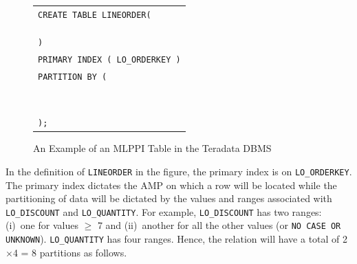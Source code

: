 \documentclass[runningheads]{comsis2}
\begin{document}
\begin{figure}[t]
\begin{center}
{\small
\begin{tabular}{l}
{\tt CREATE TABLE LINEORDER(} \\
\hspace{0.1in}{\tt LO\_ORDERKEY INTEGER,} \\
\hspace{0.1in}{\tt LO\_QUANTITY INTEGER,} \\
\hspace{0.1in}{\tt LO\_DISCOUNT INTEGER} \\
{\tt )} \\
{\tt PRIMARY INDEX ( LO\_ORDERKEY )} \\
{\tt PARTITION BY (} \\
\hspace{0.1in}{\tt CASE\_N(} \\
\hspace{0.2in}{\tt LO\_DISCOUNT >= 7,} \\
\hspace{0.2in}{\tt NO CASE OR UNKNOWN),} \\
\hspace{0.1in}{\tt CASE\_N(}\\
\hspace{0.2in}{\tt LO\_QUANTITY < 25,} \\
\hspace{0.2in}{\tt LO\_QUANTITY >= 25 AND LO\_QUANTITY <= 30,} \\
\hspace{0.2in}{\tt LO\_QUANTITY > 30 AND LO\_QUANTITY <= 35,} \\
\hspace{0.2in}{\tt NO CASE OR UNKNOWN)} \\
{\tt );} \\
\end{tabular}
}
\end{center}
\vspace{-0.2in}
\caption{An Example of an MLPPI Table in the Teradata DBMS\label{fig:exam}}
\end{figure}

In the definition of {\tt LINEORDER} in the figure, the primary index 
is on {\tt LO\_ORDERKEY}. 
The \hbox{primary} index \hbox{dictates} the AMP on which a row will be located 
while the partitioning of data will be dictated by the values and 
ranges associated with {\tt LO\_DISCOUNT} and {\tt LO\_QUANTITY}. 
For example, {\tt LO\_DISCOUNT} has two ranges: (i)~one for \hbox{values} $\geq$ 7 
and (ii)~another for all the other values (or {\tt NO CASE OR UNKNOWN}). 
{\tt LO\_QUANTITY} has four ranges. 
Hence, the relation will have a total of 2$\times$4 = 8 partitions as follows.
\end{document}
